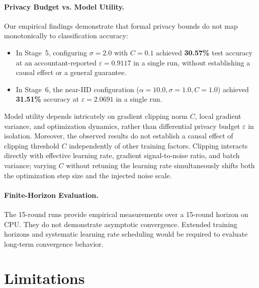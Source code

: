 \documentclass[11pt,a4paper]{article}
\begin{document}
\paragraph{Privacy Budget vs. Model Utility.}
Our empirical findings demonstrate that formal privacy bounds do not map monotonically to classification accuracy:
\begin{itemize}
    \item In Stage~5, configuring $\sigma=2.0$ with $C=0.1$ achieved \textbf{30.57\%} test accuracy at an accountant-reported $\varepsilon = 0.9117$ in a single run, without establishing a causal effect or a general guarantee.
    \item In Stage~6, the near-IID configuration ($\alpha=10.0, \sigma=1.0, C=1.0$) achieved \textbf{31.51\%} accuracy at $\varepsilon = 2.0691$ in a single run.
\end{itemize}
Model utility depends intricately on gradient clipping norm $C$, local gradient variance, and optimization dynamics, rather than differential privacy budget $\varepsilon$ in isolation. Moreover, the observed results do not establish a causal effect of clipping threshold $C$ independently of other training factors. Clipping interacts directly with effective learning rate, gradient signal-to-noise ratio, and batch variance; varying $C$ without retuning the learning rate simultaneously shifts both the optimization step size and the injected noise scale.

\paragraph{Finite-Horizon Evaluation.}
The 15-round runs provide empirical measurements over a 15-round horizon on CPU. They do not demonstrate asymptotic convergence. Extended training horizons and systematic learning rate scheduling would be required to evaluate long-term convergence behavior.

\section{Limitations}
\end{document}
